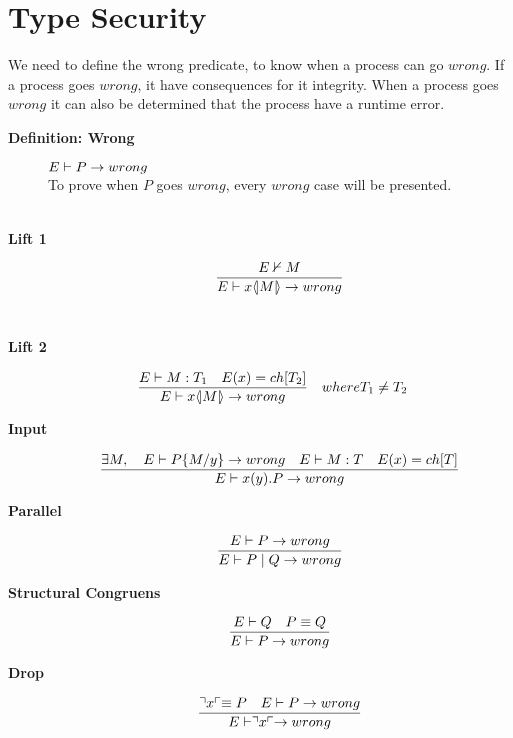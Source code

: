 \section{Type Security}

We need to define the wrong predicate, to know when a process can go \ensuremath{wrong}. If a process goes \ensuremath{wrong}, it have consequences for it integrity. When a process goes \ensuremath{wrong} it can also be determined that the process have a runtime error.
\begin{description}
\item[\textbf{Definition: Wrong}]
    \ensuremath{E \vdash P \ra wrong} \\
    
    To prove when \ensuremath{P} goes \ensuremath{wrong}, every \ensuremath{wrong} case will be presented.\\\\
    \item[\textbf{Lift 1}] \begin{align*}
        \frac{E \nvdash M}{E \vdash x \langle \! | M | \! \rangle \rightarrow wrong}
    \end{align*}\\
        
    \item[\textbf{Lift 2}] \begin{align*}
        \frac{E \vdash M:T_1 \quad E(x)=ch[T_2]}{E \vdash x \langle \! | M | \! \rangle \rightarrow wrong} &\quad where T_1 \neq T_2
    \end{align*}

    \item[\textbf{Input}] \begin{align*}
        \frac{\exists M,\quad E \vdash P\{ M/ y\} \rightarrow wrong \quad E \vdash M:T \quad E(x)= ch[T]} {E \vdash x(y).P \rightarrow wrong}\\
    \end{align*}

    \item[\textbf{Parallel}] \begin{align*}
        \frac{E \vdash P \rightarrow wrong}{E \vdash P \mid Q \rightarrow wrong}
    \end{align*}

    \item[\textbf{Structural Congruens}] \begin{align*}
        \frac{E \vdash Q \quad P \equiv Q}{E \vdash P \rightarrow wrong}
    \end{align*}

    \item[\textbf{Drop}]\begin{align*}
        \frac{\urcorner x \ulcorner \equiv P \quad E \vdash P \rightarrow wrong}{E \vdash \urcorner x \ulcorner \rightarrow wrong}
    \end{align*}


\end{description}
